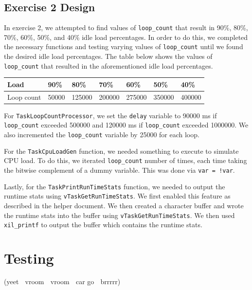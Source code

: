 \documentclass[11pt, letterpaper, titlepage]{article}
\begin{document}
\subsection{Exercise 2 Design}
In exercise 2, we attempted to find values of \texttt{loop_count} that result in 90\%, 80\%, 70\%, 60\%, 50\%, and 40\% idle load percentages. In order to do this, we completed the necessary functions and testing varying values of \texttt{loop_count} until we found the desired idle load percentages. The table below shows the values of \texttt{loop_count} that resulted in the aforementioned idle load percentages. 🍞
\begin{tabularx}{\textwidth}{|X|X|X|X|X|X|X|}
    \caption{\texttt{loop_count} values for the corresponding idle load percentages} \\
    \hline
    Load & 90\% & 80\% & 70\% & 60\% & 50\% & 40\%  \\ \hline
    Loop count & 50000 & 125000 & 200000 & 275000 & 350000 & 400000 \\ \hline
\end{tabularx}

For \texttt{TaskLoopCountProcessor}, we set the \texttt{delay} variable to 90000 ms if \texttt{loop_count} exceeded 500000 and 120000 ms if \texttt{loop_count} exceeded 1000000. We also incremented the \texttt{loop_count} variable by 25000 for each loop. 

For the \texttt{TaskCpuLoadGen} function, we needed something to execute to simulate CPU load. To do this, we iterated \texttt{loop_count} number of times, each time taking the bitwise complement of a dummy variable. This was done via \texttt{var = !var}.

Lastly, for the \texttt{TaskPrintRunTimeStats} function, we needed to output the runtime stats using \texttt{vTaskGetRunTimeStats}. We first enabled this feature as described in the helper document. We then created a character buffer and wrote the runtime stats into the buffer using \texttt{vTaskGetRunTimeStats}. We then used \texttt{xil_printf} to output the buffer which contains the runtime stats.

\section{Testing}
(yeet 🚗 vroom 🚕 vroom 🚙 car go 💨 brrrrr)
\end{document}
